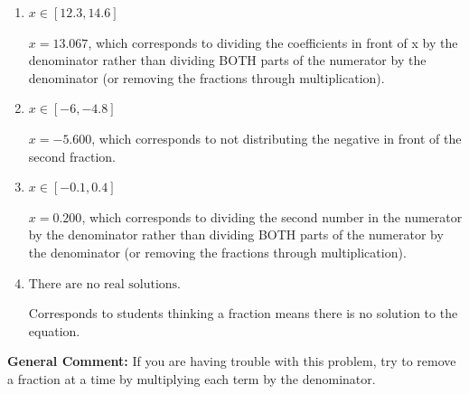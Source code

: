 \documentclass{extbook}[14pt]
\begin{document}
\begin{enumerate}
{\begin{enumerate}[label=\Alph*.]
* $x = -1.867$, which is the correct option.
\item \( x \in [12.3, 14.6] \)

 $x = 13.067$, which corresponds to dividing the coefficients in front of x by the denominator rather than dividing BOTH parts of the numerator by the denominator (or removing the fractions through multiplication).
\item \( x \in [-6, -4.8] \)

 $x = -5.600$, which corresponds to not distributing the negative in front of the second fraction.
\item \( x \in [-0.1, 0.4] \)

 $x = 0.200$, which corresponds to dividing the second number in the numerator by the denominator rather than dividing BOTH parts of the numerator by the denominator (or removing the fractions through multiplication).
\item \( \text{There are no real solutions.} \)

Corresponds to students thinking a fraction means there is no solution to the equation.
\end{enumerate}

\textbf{General Comment:} If you are having trouble with this problem, try to remove a fraction at a time by multiplying each term by the denominator.
}
\end{enumerate}
\end{document}
